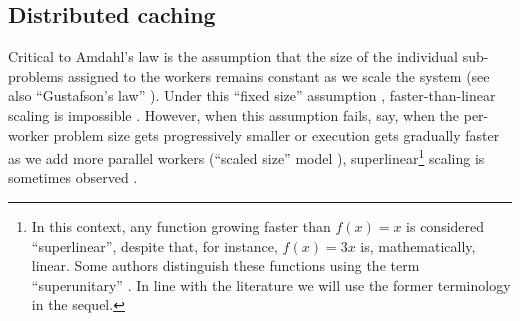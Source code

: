 


\subsection{Distributed caching}
\label{sec:backgound-dist-cache}

Critical to Amdahl's law is the assumption that the size of the individual sub-problems assigned to the workers remains constant as we scale the system (see also ``Gustafson's law'' \cite{10.1145/42411.42415}). Under this ``fixed size'' assumption \cite{556383}, faster-than-linear scaling is impossible \cite{10.1016/0167-8191(86)90024-4}. However, when this assumption fails, say, when the per-worker problem size gets progressively smaller or execution gets gradually faster as we add more parallel workers (``scaled size'' model \cite{556383}), superlinear\footnote{In this context, any function growing faster than $f(x) = x$ is considered ``superlinear'', despite that, for instance, $f(x) = 3x$ is, mathematically, linear. Some authors distinguish these functions using the term ``superunitary'' \cite{80148}. In line with the literature we will use the former terminology in the sequel.} scaling is sometimes observed \cite{scalability-analyzed, sdn-analytitcs, 6483679, 10.1007/978-3-319-77610-1, dobb-1, dobb-2}. 

